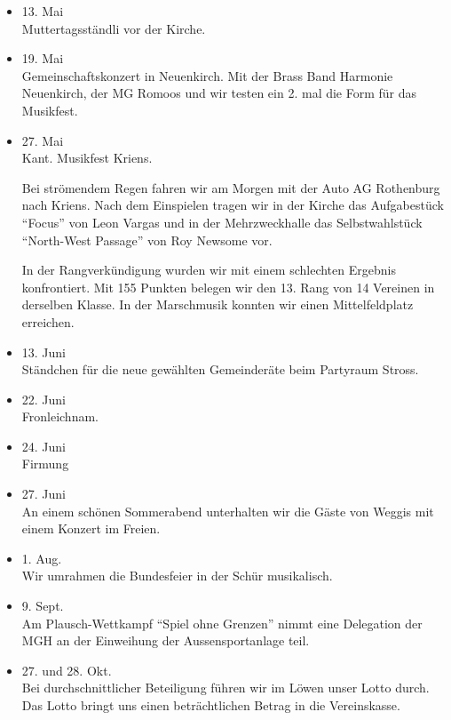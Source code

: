 \begin{history}
\begin{itemize}
        \item 13. Mai\\
              Muttertagsständli vor der Kirche.

        \item 19. Mai\\
              Gemeinschaftskonzert in Neuenkirch. Mit der Brass Band Harmonie
              Neuenkirch, der MG Romoos und wir testen ein 2. mal die Form für das
              Musikfest.

        \item 27. Mai\\
              Kant. Musikfest Kriens.

              Bei strömendem Regen fahren wir am Morgen mit der Auto AG Rothenburg
              nach Kriens. Nach dem Einspielen tragen wir in der Kirche das
              Aufgabestück \enquote{Focus} von Leon Vargas und in der Mehrzweckhalle
              das Selbstwahlstück \enquote{North-West Passage} von Roy Newsome vor.

              In der Rangverkündigung wurden wir mit einem schlechten Ergebnis
              konfrontiert. Mit 155 Punkten belegen wir den 13. Rang von 14 Vereinen
              in derselben Klasse. In der Marschmusik konnten wir einen
              Mittelfeldplatz erreichen.

        \item 13. Juni\\
              Ständchen für die neue gewählten Gemeinderäte beim Partyraum Stross.

        \item 22. Juni\\
              Fronleichnam.

        \item 24. Juni\\
              Firmung

        \item 27. Juni\\
              An einem schönen Sommerabend unterhalten wir die Gäste von Weggis mit
              einem Konzert im Freien.

        \item 1. Aug.\\
              Wir umrahmen die Bundesfeier in der Schür musikalisch.

        \item 9. Sept.\\
              Am Plausch-Wettkampf \enquote{Spiel ohne Grenzen} nimmt eine Delegation
              der MGH an der Einweihung der Aussensportanlage teil.

        \item 27. und 28. Okt.\\
              Bei durchschnittlicher Beteiligung führen wir im Löwen unser Lotto
              durch. Das Lotto bringt uns einen beträchtlichen Betrag in die
              Vereinskasse.

    \end{itemize}

\end{history}
